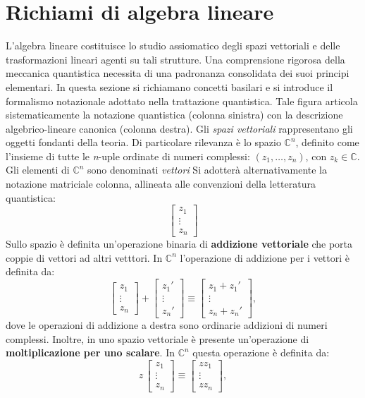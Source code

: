 \documentclass[a4paper,12pt]{report}
\theoremstyle{plain}
\begin{document}
\section{Richiami di algebra lineare}
L'algebra lineare costituisce lo studio assiomatico degli spazi vettoriali e delle trasformazioni lineari agenti su tali strutture. Una comprensione rigorosa della meccanica quantistica necessita di una padronanza consolidata dei suoi principi elementari. In questa sezione si richiamano concetti basilari e si introduce il formalismo notazionale adottato nella trattazione quantistica.
Tale figura articola sistematicamente la notazione quantistica (colonna sinistra) con la descrizione algebrico-lineare canonica (colonna destra).
Gli \textit{spazi vettoriali} rappresentano gli oggetti fondanti della teoria. Di particolare rilevanza è lo spazio \(\mathbb{C}^n\), definito come l'insieme di tutte le \textit{n}-uple ordinate di numeri complessi: \((z_1, \dots, z_n)\), con \(z_k \in \mathbb{C}\). 
Gli elementi di \(\mathbb{C}^n\) sono denominati \textit{vettori} Si adotterà alternativamente la notazione matriciale colonna, allineata alle convenzioni della letteratura quantistica:
\[
\begin{bmatrix}
  z_1 \\
  \vdots \\
  z_n
\end{bmatrix}
\]
Sullo spazio è definita un'operazione binaria di \textbf{addizione vettoriale} che porta coppie di vettori ad altri vetttori. In \(\mathbb{C}^n\) l'operazione di addizione per i vettori è definita da:
\[
\begin{bmatrix} 
z_1 \\ 
\vdots \\ 
z_n 
\end{bmatrix} 
+ 
\begin{bmatrix} 
z_1' \\ 
\vdots \\ 
z_n' 
\end{bmatrix} 
\equiv 
\begin{bmatrix} 
z_1 + z_1' \\ 
\vdots \\ 
z_n + z_n' 
\end{bmatrix},
\]
dove le operazioni di addizione a destra sono ordinarie addizioni di numeri complessi. Inoltre, in uno spazio vettoriale è presente un'operazione di \textbf{moltiplicazione per uno scalare}. In \(\mathbb{C}^n\) questa operazione è definita da:
\[
z \, 
\begin{bmatrix} 
    z_1     \\ 
    \vdots  \\ 
    z_n 
\end{bmatrix} 
\equiv
\begin{bmatrix} 
    z z_1   \\ 
    \vdots  \\ 
    z z_n 
\end{bmatrix},
\]
\end{document}
